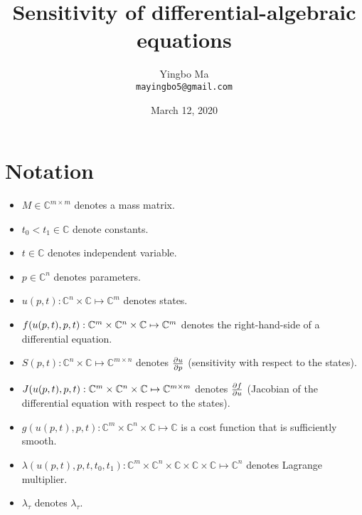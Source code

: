 \documentclass[a4paper,9pt]{article}
\theoremstyle{definition}
\theoremstyle{remark}
\begin{document}
\author{Yingbo Ma\\
        \tt{mayingbo5@gmail.com}}
\title{Sensitivity of differential-algebraic equations}
\date{March 12, 2020}

\maketitle

\section{Notation}
\begin{itemize}
  \item $M \in \mathbb{C}^{m\times m}$ denotes a mass matrix.

  \item $t_0 < t_1\in \mathbb{C}$ denote constants.

  \item $t \in \mathbb{C}$ denotes independent variable.

  \item $p\in \mathbb{C}^n$ denotes parameters.

  \item $u(p, t): \mathbb{C}^n \times \mathbb{C}\mapsto \mathbb{C}^m$ denotes
    states.

  \item $f\qty(u(p, t), p, t): \mathbb{C}^m \times \mathbb{C}^n \times
    \mathbb{C}\mapsto \mathbb{C}^{m}$ denotes the right-hand-side of a
    differential equation.

  \item $S(p, t): \mathbb{C}^n \times \mathbb{C}\mapsto \mathbb{C}^{m\times n}$
    denotes $\pdv{u}{p}$ (sensitivity with respect to the states).

  \item $J\qty(u(p, t), p, t): \mathbb{C}^m \times \mathbb{C}^n \times
    \mathbb{C} \mapsto \mathbb{C}^{m\times m}$ denotes $\pdv{f}{u}$ (Jacobian of
    the differential equation with respect to the states).

  \item $g(u(p, t), p, t): \mathbb{C}^m \times \mathbb{C}^n \times \mathbb{C}
    \mapsto \mathbb{C}$ is a cost function that is sufficiently smooth.

  \item $\lambda(u(p, t), p, t, t_0, t_1): \mathbb{C}^m \times \mathbb{C}^n
    \times \mathbb{C}\times \mathbb{C}\times \mathbb{C} \mapsto \mathbb{C}^n$
    denotes Lagrange multiplier.

  \item $\lambda_\tau$ denotes $\lambda_\tau$.
\end{itemize}
\end{document}
